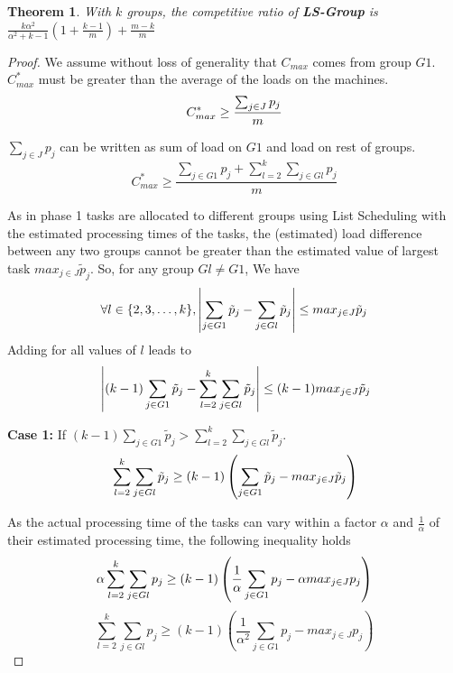 \documentclass[10pt, conference, compsocconf]{IEEEtran}
\newtheorem{theorem}{Theorem}
\begin{document}
\begin{theorem}
  \label{th:strategy3}
  With $k$ groups, the competitive ratio of
  \textbf{LS-Group } is $ \frac{k\alpha^{2}}{\alpha^{2}+k-1} (1+
  {\frac{k-1}{m}} ) + \frac{m-k}{m}$
\end{theorem}
\begin{proof} 
  We assume without loss of generality that $ C_{max}$ comes from
  group $G1$. $C_{max}^{*}$ must be greater than the average of the
  loads on the machines.
  \begin{equation}{\nonumber}
    C_{max}^{*} \geq  \frac{\sum_{j \in J}^{}{{p_{j}}}}{m}
  \end{equation}

  $\sum_{j \in J }{{p_{j}}}$ can be written as sum of load on $G1$ and
  load on rest of groups.
  \begin{equation}\label{eq11}
    C_{max}^{*} \geq  \frac{\sum_{j \in G1 }^{}{{p_{j}}}+ \sum_{l=2}^{k}\sum_{j \in Gl }^{}{{p_{j}}}}{m}
  \end{equation}

  As in phase 1 tasks are allocated to different groups using List
  Scheduling with the estimated processing times of the tasks, the
  (estimated) load difference between any two groups cannot be greater
  than the estimated value of largest task ${max_{j \in J}}{\tilde
    p_{j}}$.  So, for any group $Gl \neq G1$, We have
  \begin{equation}{\nonumber}
\forall l \in \{2, 3, \dots ,k\}, \left |\sum_{j \in G1 }^{}{\tilde p_{j}}- \sum_{j \in Gl }^{}{\tilde p_{j}} \right | \leq {max_{j \in J}}{\tilde p_{j}}
  \end{equation}  
  Adding for all values of $l$ leads to
  \begin{equation}{\nonumber}
    \left | (k-1)\sum_{j \in G1 }^{}{\tilde p_{j}}- \sum_{l=2}^{k}\sum_{j \in Gl }^{}{\tilde p_{j}} \right | \leq (k-1) {max_{j \in J}}{\tilde p_{j}}
  \end{equation}

  \textbf{Case 1:} If $(k-1)\sum_{j \in G1 }^{}{\tilde p_{j}} >
  \sum_{l=2}^{k}\sum_{j \in Gl }^{}{\tilde p_{j}}$.
  \begin{equation}{\nonumber}
    \sum_{l=2}^{k}\sum_{j \in Gl }^{}{\tilde p_{j}} \geq (k-1) \left( \sum_{j \in G1 }^{}{\tilde p_{j}}- {max_{j \in J}}{\tilde p_{j}} \right)
  \end{equation}

  As the actual processing time of the tasks can vary within a factor
  $\alpha$ and $\frac{1}{\alpha}$ of their estimated processing time,
  the following inequality holds
  \begin{equation}{\nonumber}
    \alpha\sum_{l=2}^{k}\sum_{j \in Gl }^{}{{p_{j}}} \geq (k-1) \left( \frac{1}{\alpha}\sum_{j \in G1 }^{}{{p_{j}}}- \alpha {max_{j \in J}}{{p_{j}}} \right)
  \end{equation}
  \begin{equation}\label{eq9}
    \sum_{l=2}^{k}\sum_{j \in Gl }^{}{{p_{j}}} \geq (k-1) \left(\frac{1}{\alpha^{2}}\sum_{j \in G1 }^{}{{p_{j}}}-  {max_{j \in J}}{{p_{j}}} \right)
  \end{equation}


\end{proof}
\end{document}
